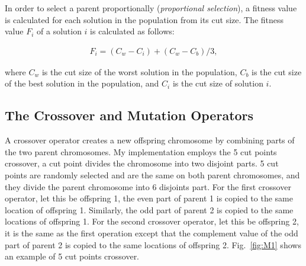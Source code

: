 \documentclass[11pt]{article}
\begin{document}
In order to select a parent proportionally (\textit{proportional selection}), a fitness value is
calculated for each solution in the population from its cut size. The fitness value \(F_i\) of a 
solution \(i\) is calculated as follows:

\begin{align*}
	F_i = (C_w - C_i) + (C_w - C_b) / 3,
\end{align*}

\noindent
where \(C_w\) is the cut size of the worst solution in the population, \(C_b\) is the cut size of 
the best solution in the population, and \(C_i\) is the cut size of solution \(i\).


\subsection{The Crossover and Mutation Operators}

A crossover operator creates a new offspring chromosome by combining parts of the two parent 
chromosomes. My implementation employs the 5 cut points crossover, a cut point divides the 
chromosome into two disjoint parts. 5 cut points are randomly selected and are the same on both
parent chromosomes, and they divide the parent chromosome into 6 disjoints part. For the first 
crossover operator, let this be offspring 1, the even part of parent 1 is copied to the same 
location of offspring 1. Similarly, the odd part of parent 2 is copied to the same locations
of offspring 1. For the second crossover operator, let this be offspring 2, it is the same as
the first operation except that the complement value of the odd part of parent 2 is copied to 
the same locations of offspring 2. Fig.~\ref{fig:M1} shows an example of 5 cut points crossover.
\end{document}
